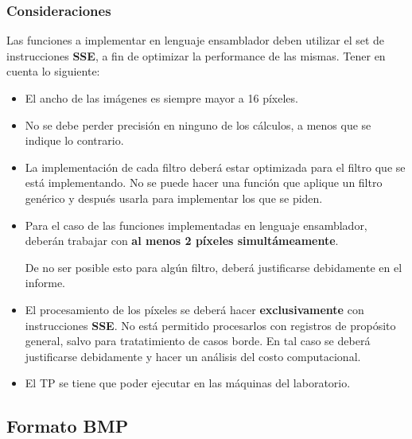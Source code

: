 \documentclass[a4paper, 12pt]{article}
\begin{document}

\subsubsection*{Consideraciones}

Las funciones a implementar en lenguaje ensamblador deben utilizar el set de
instrucciones \textbf{SSE}, a fin de optimizar la performance de las mismas.
Tener en cuenta lo siguiente:

\begin{itemize}
  \itemsep0em
  \item El ancho de las imágenes es siempre mayor a 16 píxeles.

  \item No se debe perder precisión en ninguno de los cálculos, a menos que se indique lo contrario.

  \item La implementación de cada filtro deberá estar optimizada para el
    filtro que se está implementando. No se puede hacer una función que
    aplique un filtro genérico y después usarla para implementar los que se
    piden.

  \item Para el caso de las funciones implementadas en lenguaje ensamblador,
    deberán trabajar con \textbf{al menos 2 píxeles simultámeamente}.

    De no ser posible esto para algún filtro, deberá justificarse
    debidamente en el informe.

  \item El procesamiento de los píxeles se deberá hacer
    \textbf{exclusivamente} con instrucciones \textbf{SSE}.
    No está permitido procesarlos con registros de propósito general,
    salvo para tratatimiento de casos borde. En tal caso se deberá
    justificarse debidamente y hacer un análisis del costo computacional.

  \item El TP se tiene que poder ejecutar en las máquinas del laboratorio.
\end{itemize}



\subsection{Formato BMP}
\end{document}
